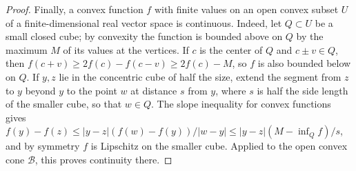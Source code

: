 \begin{proof}
Finally, a convex function $f$ with finite values on an open convex subset $U$ of a finite-dimensional real vector space is continuous. Indeed, let $Q\subset U$ be a small closed cube; by convexity the function is bounded above on $Q$ by the maximum $M$ of its values at the vertices. If $c$ is the center of $Q$ and $c\pm v\in Q$, then $f(c+v)\geq2f(c)-f(c-v)\geq2f(c)-M$, so $f$ is also bounded below on $Q$. If $y,z$ lie in the concentric cube of half the size, extend the segment from $z$ to $y$ beyond $y$ to the point $w$ at distance $s$ from $y$, where $s$ is half the side length of the smaller cube, so that $w\in Q$. The slope inequality for convex functions gives $f(y)-f(z)\leq|y-z|(f(w)-f(y))/|w-y|\leq|y-z|(M-\inf_Qf)/s$, and by symmetry $f$ is Lipschitz on the smaller cube. Applied to the open convex cone $\mathcal B$, this proves continuity there.
\end{proof}

